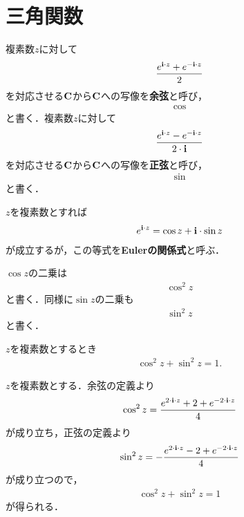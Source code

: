 \section{三角関数}
	\begin{screen}
		\begin{dfn}[三角関数]
			複素数$z$に対して
			\begin{align}
				\frac{e^{\mathbf{i} \cdot z} + e^{-\mathbf{i} \cdot z}}{2}
			\end{align}
			を対応させる$\mathbf{C}$から$\mathbf{C}$への写像を{\bf 余弦}と呼び，
			\begin{align}
				\cos
			\end{align}
			と書く．複素数$z$に対して
			\begin{align}
				\frac{e^{\mathbf{i} \cdot z} - e^{-\mathbf{i} \cdot z}}{2 \cdot \mathbf{i}}
			\end{align}
			を対応させる$\mathbf{C}$から$\mathbf{C}$への写像を{\bf 正弦}と呼び，
			\begin{align}
				\sin
			\end{align}
			と書く．
		\end{dfn}
	\end{screen}
	
	$z$を複素数とすれば
	\begin{align}
		e^{\mathbf{i} \cdot z} = \cos{z} + \mathbf{i} \cdot \sin{z}
	\end{align}
	が成立するが，この等式を{\bf Eulerの関係式}と呼ぶ．
	
	$\cos{z}$の二乗は
	\begin{align}
		\cos^2{z}
	\end{align}
	と書く．同様に$\sin{z}$の二乗も
	\begin{align}
		\sin^2{z}
	\end{align}
	と書く．
	
	\begin{screen}
		\begin{thm}[余弦と正弦の二乗和は$1$]
			$z$を複素数とするとき
			\begin{align}
				\cos^2{z} + \sin^2{z} = 1.
			\end{align}
		\end{thm}
	\end{screen}
	
	\begin{sketch}
		$z$を複素数とする．余弦の定義より
		\begin{align}
			\cos^2{z} = \frac{e^{2 \cdot \mathbf{i} \cdot z} + 2 + e^{-2 \cdot \mathbf{i} \cdot z}}{4}
		\end{align}
		が成り立ち，正弦の定義より
		\begin{align}
			\sin^2{z} = -\frac{e^{2 \cdot \mathbf{i} \cdot z} - 2 + e^{-2 \cdot \mathbf{i} \cdot z}}{4}
		\end{align}
		が成り立つので，
		\begin{align}
			\cos^2{z} + \sin^2{z} = 1
		\end{align}
		が得られる．
		\QED
	\end{sketch}
	
